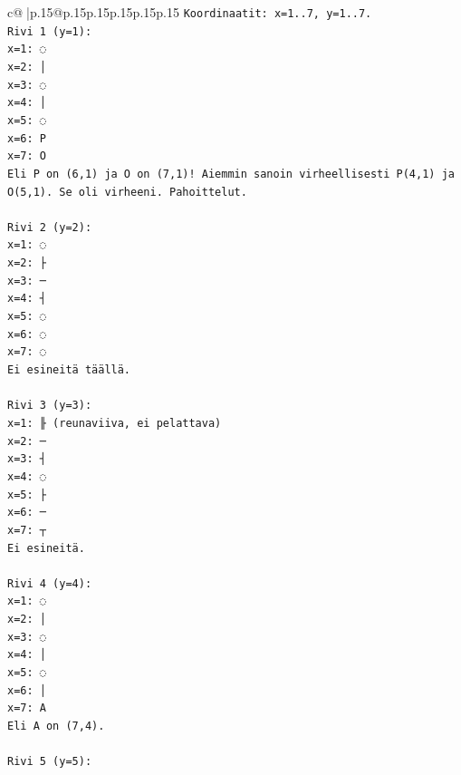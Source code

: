 \documentclass{article}
\begin{document}
{\begin{supertabular}{c@{$\;$}|p{.15\linewidth}@{}p{.15\linewidth}p{.15\linewidth}p{.15\linewidth}p{.15\linewidth}p{.15\linewidth}}
{{{\texttt{Koordinaatit: x=1..7, y=1..7.} \\
\texttt{Rivi 1 (y=1): } \\
\texttt{x=1: ◌} \\
\texttt{x=2: │} \\
\texttt{x=3: ◌} \\
\texttt{x=4: │} \\
\texttt{x=5: ◌} \\
\texttt{x=6: P} \\
\texttt{x=7: O} \\
\texttt{Eli P on (6,1) ja O on (7,1)! Aiemmin sanoin virheellisesti P(4,1) ja O(5,1). Se oli virheeni. Pahoittelut.} \\
\\ 
\texttt{Rivi 2 (y=2):} \\
\texttt{x=1: ◌} \\
\texttt{x=2: ├} \\
\texttt{x=3: ─} \\
\texttt{x=4: ┤} \\
\texttt{x=5: ◌} \\
\texttt{x=6: ◌} \\
\texttt{x=7: ◌} \\
\texttt{Ei esineitä täällä.} \\
\\ 
\texttt{Rivi 3 (y=3):} \\
\texttt{x=1: ╟ (reunaviiva, ei pelattava)} \\
\texttt{x=2: ─} \\
\texttt{x=3: ┤} \\
\texttt{x=4: ◌} \\
\texttt{x=5: ├} \\
\texttt{x=6: ─} \\
\texttt{x=7: ┬} \\
\texttt{Ei esineitä.} \\
\\ 
\texttt{Rivi 4 (y=4):} \\
\texttt{x=1: ◌} \\
\texttt{x=2: │} \\
\texttt{x=3: ◌} \\
\texttt{x=4: │} \\
\texttt{x=5: ◌} \\
\texttt{x=6: │} \\
\texttt{x=7: A} \\
\texttt{Eli A on (7,4).} \\
\\ 
\texttt{Rivi 5 (y=5):} \\
}}}
\end{supertabular}}
\end{document}
